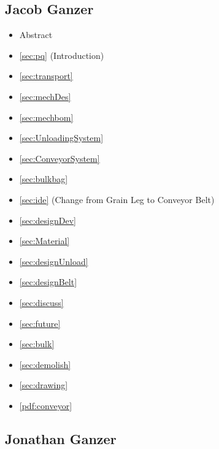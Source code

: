 \documentclass[10pt]{project}
\begin{document}
\subsection{Jacob Ganzer}
\begin{itemize}
    \item Abstract
    \item \ref{sec:pq} (Introduction)
    \item \ref{sec:transport}
    
    \item \ref{sec:mechDes}
    \item \ref{sec:mechbom}
    
    \item  \ref{sec:UnloadingSystem}
    \item \ref{sec:ConveyorSystem}
    \item \ref{sec:bulkbag}
    \item \ref{sec:ide} (Change from Grain Leg to Conveyor Belt)
    \item \ref{sec:designDev}
    \item \ref{sec:Material}
    \item \ref{sec:designUnload}
    \item \ref{sec:designBelt}
    \item \ref{sec:discuss}
    \item \ref{sec:future}
    \item \ref{sec:bulk}
    \item \ref{sec:demolish}
    \item \ref{sec:drawing}
    \item \ref{pdf:conveyor}

\end{itemize}


\subsection{Jonathan Ganzer}
\begin{itemize}
    \item \ref{sec:CaCl} - Adverse Reactions portion, Stainless Steel Cracking
    \item \ref{sec:HFAcid}
    \item \ref{sec:UnloadingSystem}
    \item \ref{sec:ConveyorSystem}
    \item \ref{sec:MixingSystem}
    \item \ref{sec:GanttChart} - Introduction
    \item \ref{sec:Ideation-Mixer}
    \item \ref{sec:MixingSystemRefinement}}
    \item \ref{pdf:belt}
    \item \ref{pdf:conveyor}
    \item \ref{pdf:mixer}
\end{itemize}
\end{document}
